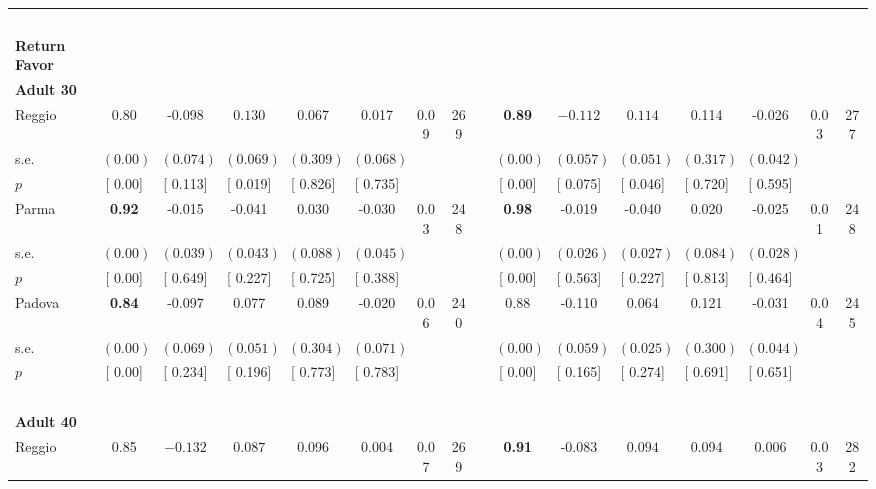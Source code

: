 \begin{longtable}{L{8em} c c c c c c c p{1em} c c c c c c c}
~\\[1em]
\textbf{Return Favor} \\*
\quad \quad \textbf{Adult 30} & & & & & & & & & & & & & & & \\* 
\quad \quad \quad Reggio& 0.80 &    -0.098 & $ \mathbf{    0.130}$ &     0.067 &     0.017 &      0.09 &       269 & & \textbf{     0.89} & $ \mathbf{   -0.112}$ & $ \mathbf{    0.114}$ &     0.114 &    -0.026 &      0.03 &       277  \\*
\quad \quad \quad \quad s.e.& $ (     0.00)$ & $ (    0.074)$ & $ (    0.069)$ & $ (    0.309)$ & $ (    0.068)$ & & & & $ (     0.00)$ & $ (    0.057)$ & $ (    0.051)$ & $ (    0.317)$ & $ (    0.042)$ & &  \\*
\quad \quad \quad \quad $ p$ & [     0.00] & [    0.113] & [    0.019] & [    0.826] & [    0.735] & & & & [     0.00] & [    0.075] & [    0.046] & [    0.720] & [    0.595] & &  \\[1em]
\quad \quad \quad Parma& \textbf{     0.92} &    -0.015 &    -0.041 &     0.030 &    -0.030 &      0.03 &       248 & & \textbf{     0.98} &    -0.019 &    -0.040 &     0.020 &    -0.025 &      0.01 &       248  \\*
\quad \quad \quad \quad s.e.& $ (     0.00)$ & $ (    0.039)$ & $ (    0.043)$ & $ (    0.088)$ & $ (    0.045)$ & & & & $ (     0.00)$ & $ (    0.026)$ & $ (    0.027)$ & $ (    0.084)$ & $ (    0.028)$ & &  \\*
\quad \quad \quad \quad $ p$ & [     0.00] & [    0.649] & [    0.227] & [    0.725] & [    0.388] & & & & [     0.00] & [    0.563] & [    0.227] & [    0.813] & [    0.464] & &  \\[1em]
\quad \quad \quad Padova& \textbf{     0.84} &    -0.097 &     0.077 &     0.089 &    -0.020 &      0.06 &       240 & & 0.88 &    -0.110 &     0.064 &     0.121 &    -0.031 &      0.04 &       245  \\*
\quad \quad \quad \quad s.e.& $ (     0.00)$ & $ (    0.069)$ & $ (    0.051)$ & $ (    0.304)$ & $ (    0.071)$ & & & & $ (     0.00)$ & $ (    0.059)$ & $ (    0.025)$ & $ (    0.300)$ & $ (    0.044)$ & &  \\*
\quad \quad \quad \quad $ p$ & [     0.00] & [    0.234] & [    0.196] & [    0.773] & [    0.783] & & & & [     0.00] & [    0.165] & [    0.274] & [    0.691] & [    0.651] & &  \\[1em]
~\\[1em]
\quad \quad \textbf{Adult 40} & & & & & & & & & & & & & & & \\* 
\quad \quad \quad Reggio& 0.85 & $ \mathbf{   -0.132}$ & $ \mathbf{    0.087}$ &     0.096 &     0.004 &      0.07 &       269 & & \textbf{     0.91} &    -0.083 & $ \mathbf{    0.094}$ &     0.094 &     0.006 &      0.03 &       282  \\*

\end{longtable}
